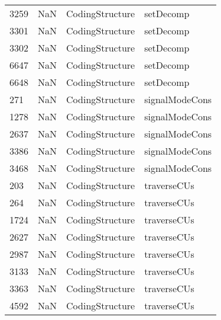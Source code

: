 \begin{tabular}{llll}
3259 &                   NaN &            CodingStructure &                                 setDecomp \\
3301 &                   NaN &            CodingStructure &                                 setDecomp \\
3302 &                   NaN &            CodingStructure &                                 setDecomp \\
6647 &                   NaN &            CodingStructure &                                 setDecomp \\
6648 &                   NaN &            CodingStructure &                                 setDecomp \\
271  &                   NaN &            CodingStructure &                            signalModeCons \\
1278 &                   NaN &            CodingStructure &                            signalModeCons \\
2637 &                   NaN &            CodingStructure &                            signalModeCons \\
3386 &                   NaN &            CodingStructure &                            signalModeCons \\
3468 &                   NaN &            CodingStructure &                            signalModeCons \\
203  &                   NaN &            CodingStructure &                               traverseCUs \\
264  &                   NaN &            CodingStructure &                               traverseCUs \\
1724 &                   NaN &            CodingStructure &                               traverseCUs \\
2627 &                   NaN &            CodingStructure &                               traverseCUs \\
2987 &                   NaN &            CodingStructure &                               traverseCUs \\
3133 &                   NaN &            CodingStructure &                               traverseCUs \\
3363 &                   NaN &            CodingStructure &                               traverseCUs \\
4592 &                   NaN &            CodingStructure &                               traverseCUs \\

\end{tabular}
